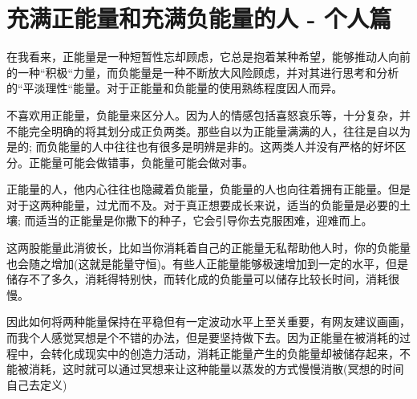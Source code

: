 ﻿\chapter{充满正能量和充满负能量的人 - 个人篇}

在我看来，正能量是一种短暂性忘却顾虑，它总是抱着某种希望，能够推动人向前的一种“积极“力量，而负能量是一种不断放大风险顾虑，并对其进行思考和分析的“平淡理性“能量。对于正能量和负能量的使用熟练程度因人而异。

不喜欢用正能量，负能量来区分人。因为人的情感包括喜怒哀乐等，十分复杂，并不能完全明确的将其划分成正负两类。那些自以为正能量满满的人，往往是自以为是的; 而负能量的人中往往也有很多是明辨是非的。这两类人并没有严格的好坏区分。正能量可能会做错事，负能量可能会做对事。

正能量的人，他内心往往也隐藏着负能量，负能量的人也向往着拥有正能量。但是对于这两种能量，过尤而不及。对于真正想要成长来说，适当的负能量是必要的土壤; 而适当的正能量是你撒下的种子，它会引导你去克服困难，迎难而上。

这两股能量此消彼长，比如当你消耗着自己的正能量无私帮助他人时，你的负能量也会随之增加(这就是能量守恒)。有些人正能量能够极速增加到一定的水平，但是储存不了多久，消耗得特别快，而转化成的负能量可以储存比较长时间，消耗很慢。

因此如何将两种能量保持在平稳但有一定波动水平上至关重要，有网友建议画画，而我个人感觉冥想是个不错的办法，但是要坚持做下去。因为正能量在被消耗的过程中，会转化成现实中的创造力活动，消耗正能量产生的负能量却被储存起来，不能被消耗，这时就可以通过冥想来让这种能量以蒸发的方式慢慢消散(冥想的时间自己去定义)
